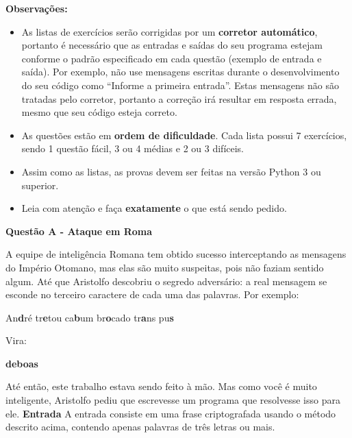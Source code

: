 \documentclass[a4paper, 12pt]{article}
\begin{document}
\textbf{{\large Observações:}}
\begin{itemize}
	\item As listas de exercícios serão corrigidas por um \textbf{corretor automático}, portanto é necessário que as entradas e saídas do seu programa estejam conforme o padrão especificado em cada questão (exemplo de entrada e saída). Por exemplo, não use mensagens escritas durante o desenvolvimento do seu código como ``Informe a primeira entrada''. Estas mensagens não são tratadas pelo corretor, portanto a correção irá resultar em resposta errada, mesmo que seu código esteja correto.
	\item As questões estão em \textbf{ordem de dificuldade}. Cada lista possui 7 exercícios, sendo 1 questão fácil, 3 ou 4 médias e 2 ou 3 difíceis.
	\item Assim como as listas, as provas devem ser feitas na versão Python 3 ou superior.
	\item Leia com atenção e faça \textbf{exatamente} o que está sendo pedido.
\end{itemize}
\newpage %
\begin{center}
\textbf{{\Large Questão A - Ataque em Roma}}
\end{center}
\vspace{5pt}
A equipe de inteligência Romana tem obtido sucesso interceptando as mensagens do Império Otomano, mas elas são muito suspeitas, pois não faziam sentido algum. Até que Aristolfo descobriu o segredo adversário: a real mensagem se esconde no terceiro caractere de cada uma das palavras. Por exemplo:
\newline
\begin{center} An\textbf{d}ré tr\textbf{e}tou ca\textbf{b}um br\textbf{o}cado tr\textbf{a}ns pu\textbf{s}\end{center}
Vira: \newline
\begin{center} \textbf{deboas}\end{center}
Até então, este trabalho estava sendo feito à mão. Mas como você é muito
inteligente, Aristolfo pediu que escrevesse um programa que resolvesse isso
para ele.
\newline \newline
\textbf{{\large Entrada}} \newline
A entrada consiste em uma frase criptografada usando o método descrito acima, contendo apenas palavras de três letras ou mais.
\newline \newline
\end{document}
